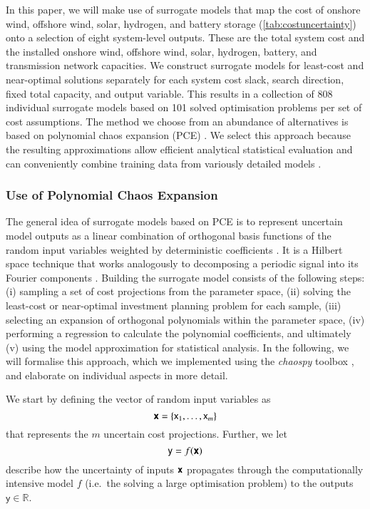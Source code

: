 
In this paper, we will make use of surrogate models that map the
cost of onshore wind, offshore wind, solar, hydrogen, and battery storage (\cref{tab:costuncertainty})
onto a selection of eight system-level outputs.
These are the total system cost and the installed onshore wind, offshore wind, solar, hydrogen, battery, and transmission network capacities.
We construct surrogate models for least-cost and near-optimal solutions separately
for each system cost slack, search direction, fixed total capacity, and output variable. This results in a collection of 808 individual surrogate models based on 101 solved optimisation problems
per set of cost assumptions.
The method we choose from an abundance of alternatives is based on polynomial chaos expansion (PCE)
\cite{sudret_global_2008,fajraoui_optimal_2017,gratiet_metamodel-based_2015}.
We select this approach because the resulting approximations
allow efficient analytical statistical evaluation \cite{sudret_global_2008} and
can conveniently combine training data from variously detailed models \cite{palar_multi-fidelity_2016}.

\subsubsection{Use of Polynomial Chaos Expansion}
\label{sec:pce}


The general idea of surrogate models based on PCE is to
represent uncertain model outputs as a linear combination of orthogonal basis functions 
of the random input variables weighted by deterministic coefficients \cite{muhlpfordt_uncertainty_2020}.
It is a Hilbert space technique that works analogously to decomposing a periodic signal into its Fourier components \cite{muhlpfordt_uncertainty_2020}.
Building the surrogate model consists of the following steps:
(i) sampling a set of cost projections from the parameter space,
(ii) solving the least-cost or near-optimal investment planning problem for each sample,
(iii) selecting an expansion of orthogonal polynomials within the parameter space,
(iv) performing a regression to calculate the polynomial coefficients, and ultimately
(v) using the model approximation for statistical analysis.
In the following, we will formalise this approach,
which we implemented using the \textit{chaospy} toolbox \cite{feinberg_chaospy_2015},
and elaborate on individual aspects in more detail.

We start by defining the vector of random input variables as
\begin{equation}
    \boldsymbol{\mathsf{x}} = \{\mathsf{x}_1, \dots , \mathsf{x}_m\}
\end{equation}
that represents the $m$ uncertain cost projections.
Further, we let
\begin{equation}
    \mathsf{y} = f(\boldsymbol{\mathsf{x}})
\end{equation}
describe how the uncertainty of inputs $\boldsymbol{\mathsf{x}}$ propagates
through the computationally intensive model $f$
(i.e.~the solving a large optimisation problem)
to the outputs $\mathsf{y} \in \mathbb{R}$.


